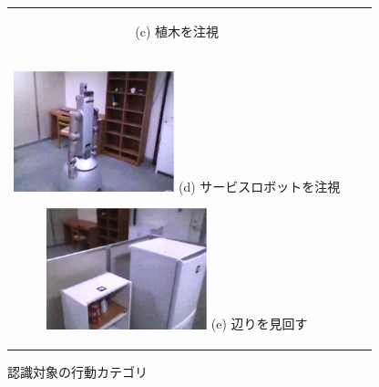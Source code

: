 \begin{figure}[htbp]
\begin{tabular}{ccc}
\begin{minipage}{0.33\textwidth}
\begin{center}
      \hspace{1.6cm} (c) 植木を注視
      \vspace{3mm}
    \end{center}
  \end{minipage} \\
%
  \begin{minipage}{0.33\textwidth}
    \begin{center}
      \includegraphics[height=35mm]{figure/fpv_robot.eps}
      \hspace{1.6cm} (d) サービスロボットを注視
    \end{center}
  \end{minipage}
%
  \begin{minipage}{0.33\textwidth}
    \begin{center}
      \includegraphics[height=35mm]{figure/fpv_around.eps}
      \hspace{1.6cm} (e) 辺りを見回す
    \end{center}
  \end{minipage}
%
\end{tabular}
\caption{認識対象の行動カテゴリ}
\label{fig:activities}
\end{figure}

